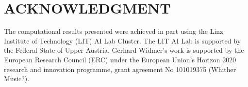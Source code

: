 \documentclass[lettersize,journal]{IEEEtran}
\begin{document}
\section{ACKNOWLEDGMENT}

The computational results presented were achieved in part using the Linz Institute of Technology (LIT) AI Lab Cluster. The LIT AI Lab is supported by the Federal State of Upper Austria. Gerhard Widmer's work is supported by the European Research Council (ERC) under the European Union's Horizon 2020 research and innovation programme, grant agreement No 101019375 (Whither Music?).





\newpage

\vfill
\end{document}
